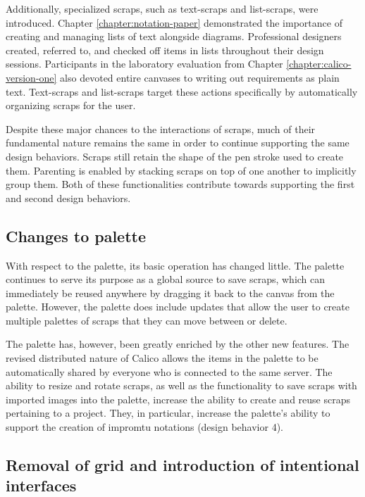 \documentclass[12pt,fleqn]{ucithesis}
\begin{document}
Additionally, specialized scraps, such as text-scraps and list-scraps, were introduced. Chapter \ref{chapter:notation-paper} demonstrated the importance of creating and managing lists of text alongside diagrams. Professional designers created, referred to, and checked off items in lists throughout their design sessions. Participants in the laboratory evaluation from Chapter \ref{chapter:calico-version-one} also devoted entire canvases to writing out requirements as plain text. Text-scraps and list-scraps target these actions specifically by automatically organizing scraps for the user.

Despite these major chances to the interactions of scraps, much of their fundamental nature remains the same in order to continue supporting the same design behaviors. Scraps still retain the shape of the pen stroke used to create them. Parenting is enabled by stacking scraps on top of one another to implicitly group them. Both of these functionalities contribute towards supporting the first and second design behaviors.

\subsection{Changes to palette}

With respect to the palette, its basic operation has changed little. The palette continues to serve its purpose as a global source to save scraps, which can immediately be reused anywhere by dragging it back to the canvas from the palette. However, the palette does include updates that allow the user to create multiple palettes of scraps that they can move between or delete. 

The palette has, however, been greatly enriched by the other new features. The revised distributed nature of Calico allows the items in the palette to be automatically shared by everyone who is connected to the same server. The ability to resize and rotate scraps, as well as the functionality to save scraps with imported images into the palette, increase the ability to create and reuse scraps pertaining to a project. They, in particular, increase the palette's ability to support the creation of impromtu notations (design behavior 4).

\subsection{Removal of grid and introduction of intentional interfaces}
\end{document}
